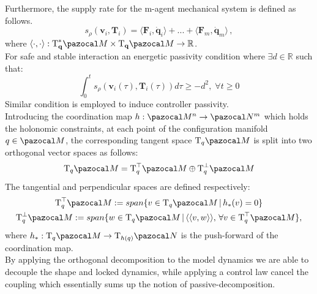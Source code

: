 Furthermore, the supply rate for the m-agent mechanical system is defined as follows.
\begin{equation}
	s_\rho(\textbf{v}_i, \textbf{T}_i) = \langle\textbf{F}_i, \dot{\textbf{q}}_i \rangle + ... + \langle\textbf{F}_m, \dot{\textbf{q}}_m \rangle \, ,
\end{equation}
where $\langle \cdot, \cdot \rangle: \text{T}_{\textbf{q}}^*\Ma \times \text{T}_{\textbf{q}}\Ma  \rightarrow \mathbb{R}$. \\
\noindent For safe and stable interaction an energetic passivity condition where $\exists d\in\mathbb{R}$ such that: 
\begin{equation}
	 \int_{0}^{t}	s_\rho(\textbf{v}_i(\tau), \textbf{T}_i(\tau))d\tau \geq -d^2, \;\forall t\geq 0
\end{equation}
Similar condition is employed to induce controller passivity. \\
Introducing the coordination map $h:\Ma^n \rightarrow \Na^m$ which holds the holonomic constraints, at each point of the configuration manifold $q\in\Ma$, the corresponding tangent space $\text{T}_q\Ma$
is split into two orthogonal vector spaces as follows:
\begin{equation}
	\text{T}_q\Ma = \text{T}_q^\top \Ma \oplus \text{T}_q^{\perp} \Ma
\end{equation}
The tangential and perpendicular spaces are defined respectively:
\begin{gather}
	\text{T}_q^\top\Ma := span \{v \in \text{T}_q\Ma \, \vert \, h_*(v) = 0\}  \\
	\text{T}_q^\perp\Ma := span \{w \in \text{T}_q\Ma \, \vert \, \langle \langle v, w \rangle \rangle, \, \forall v \in \text{T}_q^\top \Ma  \}, 
\end{gather}
where $h_*: \text{T}_q\Ma \rightarrow \text{T}_{h(q)}\Na$ is the push-forward of the coordination map. \\
By applying the orthogonal decomposition to the model dynamics we are able to decouple the shape and locked dynamics, while applying a control law cancel the coupling which essentially sums up the notion of passive-decomposition.

